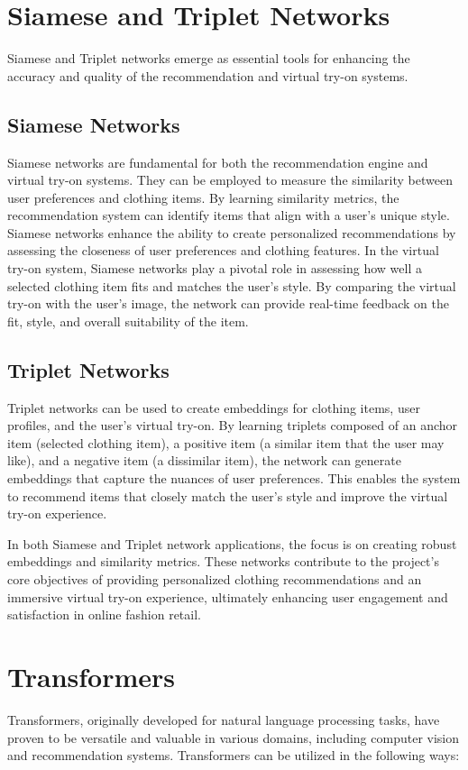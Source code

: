 \section{Siamese and Triplet Networks}
	Siamese and Triplet networks emerge as essential tools for enhancing the accuracy and quality of the recommendation and virtual try-on systems.

	\subsection*{Siamese Networks}
		Siamese networks are fundamental for both the recommendation engine and virtual try-on systems. They can be employed to measure the similarity between user preferences and clothing items. By learning similarity metrics, the recommendation system can identify items that align with a user's unique style. Siamese networks enhance the ability to create personalized recommendations by assessing the closeness of user preferences and clothing features. In the virtual try-on system, Siamese networks play a pivotal role in assessing how well a selected clothing item fits and matches the user's style. By comparing the virtual try-on with the user's image, the network can provide real-time feedback on the fit, style, and overall suitability of the item.

	\subsection*{Triplet Networks}
		Triplet networks can be used to create embeddings for clothing items, user profiles, and the user's virtual try-on. By learning triplets composed of an anchor item (selected clothing item), a positive item (a similar item that the user may like), and a negative item (a dissimilar item), the network can generate embeddings that capture the nuances of user preferences. This enables the system to recommend items that closely match the user's style and improve the virtual try-on experience.

	In both Siamese and Triplet network applications, the focus is on creating robust embeddings and similarity metrics. These networks contribute to the project's core objectives of providing personalized clothing recommendations and an immersive virtual try-on experience, ultimately enhancing user engagement and satisfaction in online fashion retail.

\section{Transformers}
	Transformers, originally developed for natural language processing tasks, have proven to be versatile and valuable in various domains, including computer vision and recommendation systems. Transformers can be utilized in the following ways:

